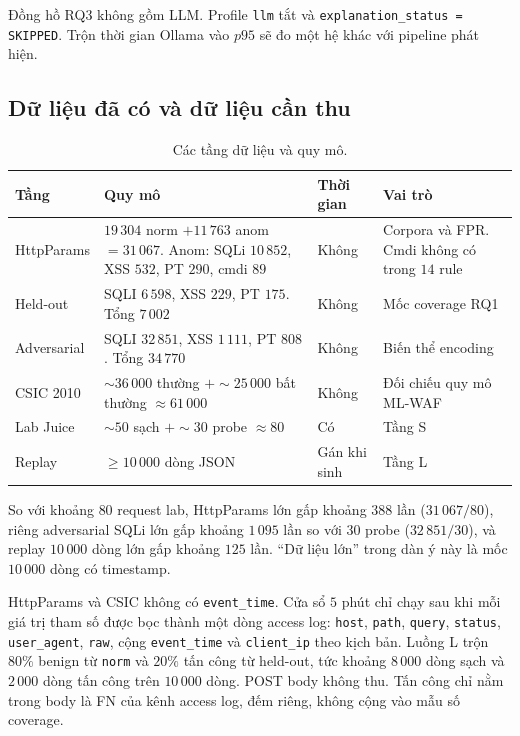 \documentclass[a4paper,11pt]{article}
\begin{document}
Đồng hồ RQ3 không gồm LLM. Profile \texttt{llm} tắt và \texttt{explanation\_status = SKIPPED}. Trộn thời gian Ollama vào $p95$ sẽ đo một hệ khác với pipeline phát hiện.

\subsection{Dữ liệu đã có và dữ liệu cần thu}

\begin{table}[ht]
\centering
\caption{Các tầng dữ liệu và quy mô.}
\label{tab:data}
\small
\begin{tabularx}{\linewidth}{@{}p{3.5cm}Y p{2.3cm}Y@{}}
\toprule
Tầng & Quy mô & Thời gian & Vai trò \\
\midrule
HttpParams & $19\,304$ norm ${+} 11\,763$ anom ${=} 31\,067$. Anom: SQLi $10\,852$, XSS $532$, PT $290$, cmdi $89$ & Không & Corpora và FPR. Cmdi không có trong $14$ rule \\
Held-out & SQLI $6\,598$, XSS $229$, PT $175$. Tổng $7\,002$ & Không & Mốc coverage RQ1 \\
Adversarial & SQLI $32\,851$, XSS $1\,111$, PT $808$. Tổng $34\,770$ & Không & Biến thể encoding \\
CSIC 2010 & $\sim 36\,000$ thường ${+} \sim 25\,000$ bất thường $\approx 61\,000$ & Không & Đối chiếu quy mô ML-WAF \\
Lab Juice & $\sim 50$ sạch ${+} \sim 30$ probe $\approx 80$ & Có & Tầng S \\
Replay & $\geq 10\,000$ dòng JSON & Gán khi sinh & Tầng L \\
\bottomrule
\end{tabularx}
\end{table}

So với khoảng $80$ request lab, HttpParams lớn gấp khoảng $388$ lần ($31\,067/80$), riêng adversarial SQLi lớn gấp khoảng $1\,095$ lần so với $30$ probe ($32\,851/30$), và replay $10\,000$ dòng lớn gấp khoảng $125$ lần. ``Dữ liệu lớn'' trong dàn ý này là mốc $10\,000$ dòng có timestamp.

HttpParams và CSIC không có \texttt{event\_time}. Cửa sổ $5$ phút chỉ chạy sau khi mỗi giá trị tham số được bọc thành một dòng access log: \texttt{host}, \texttt{path}, \texttt{query}, \texttt{status}, \texttt{user\_agent}, \texttt{raw}, cộng \texttt{event\_time} và \texttt{client\_ip} theo kịch bản. Luồng L trộn $80\%$ benign từ \texttt{norm} và $20\%$ tấn công từ held-out, tức khoảng $8\,000$ dòng sạch và $2\,000$ dòng tấn công trên $10\,000$ dòng. POST body không thu. Tấn công chỉ nằm trong body là FN của kênh access log, đếm riêng, không cộng vào mẫu số coverage.
\end{document}
